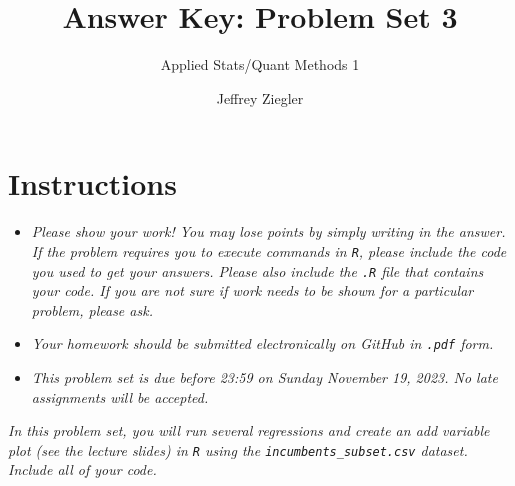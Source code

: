\documentclass[12pt,letterpaper]{article}
\title{Answer Key: Problem Set 3}
\date{Jeffrey Ziegler}
\author{Applied Stats/Quant Methods 1}
\begin{document}
	\maketitle
	
	\section*{Instructions}
	\begin{itemize}
		\item \textit{Please show your work! You may lose points by simply writing in the answer. If the problem requires you to execute commands in \texttt{R}, please include the code you used to get your answers. Please also include the \texttt{.R} file that contains your code. If you are not sure if work needs to be shown for a particular problem, please ask.}
		\item \textit{Your homework should be submitted electronically on GitHub in \texttt{.pdf} form.}
		\item \textit{This problem set is due before 23:59 on Sunday November 19, 2023. No late assignments will be accepted.}

	\end{itemize}
	\vspace{.25cm}
	
	\noindent \emph{In this problem set, you will run several regressions and create an add variable plot (see the lecture slides) in \texttt{R} using the \texttt{incumbents\_subset.csv} dataset. Include all of your code.}
	
	\vspace{.5cm}
\end{document}
